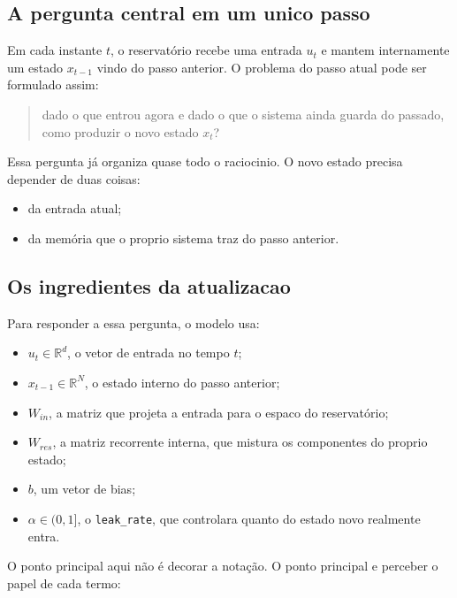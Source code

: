 \documentclass[12pt]{article}
\providecommand{\tightlist}{%
              \setlength{\itemsep}{0pt}\setlength{\parskip}{0pt}}
\begin{document}
\subsection{A pergunta central em um unico passo}\label{31-a-pergunta-central-em-um-unico-passo}

Em cada instante \(t\), o reservatório recebe uma entrada \(u_t\) e mantem internamente um estado \(x_{t-1}\) vindo do passo anterior. O problema do passo atual pode ser formulado assim:

\begin{quote}
dado o que entrou agora e dado o que o sistema ainda guarda do passado, como produzir o novo estado \(x_t\)?
\end{quote}

Essa pergunta já organiza quase todo o raciocinio. O novo estado precisa depender de duas coisas:

\begin{itemize}
\tightlist
\item
  da entrada atual;
\item
  da memória que o proprio sistema traz do passo anterior.
\end{itemize}

\subsection{Os ingredientes da atualizacao}\label{32-os-ingredientes-da-atualizacao}

Para responder a essa pergunta, o modelo usa:

\begin{itemize}
\tightlist
\item
  \(u_t \in \mathbb{R}^d\), o vetor de entrada no tempo \(t\);
\item
  \(x_{t-1} \in \mathbb{R}^N\), o estado interno do passo anterior;
\item
  \(W_{in}\), a matriz que projeta a entrada para o espaco do reservatório;
\item
  \(W_{res}\), a matriz recorrente interna, que mistura os componentes do proprio estado;
\item
  \(b\), um vetor de bias;
\item
  \(\alpha \in (0,1]\), o \texttt{leak\_rate}, que controlara quanto do estado novo realmente entra.
\end{itemize}

O ponto principal aqui não é decorar a notação. O ponto principal e perceber o papel de cada termo:
\end{document}
